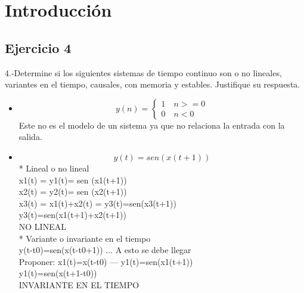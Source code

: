 \documentclass[10pt,a4paper]{report}
\begin{document}
\thispagestyle{fancy}
\tableofcontents
\newpage
\setcounter{chapter}{1}
\section[Introducción]{Introducción}

\subsection{Ejercicio 4}
4.-Determine si los siguientes sistemas de tiempo continuo son o no lineales, variantes en el tiempo, causales, con memoria y estables. Justifique su respuesta.
\begin{itemize}
\item \begin{equation}
 y(n)=
 \left\{
  \begin{aligned}
   1\quad n>=0\\
   0\quad n<0\
  \end{aligned}
 \right.
\label{escunit}
\end{equation}
Este no es el modelo de un sistema ya que no relaciona la entrada con la salida.
\item  \begin{equation*}
y(t)=sen(x(t+1))
\end{equation*} 
* Lineal o no lineal\\
   
   x1(t) = y1(t)= sen (x1(t+1))\\
   x2(t) = y2(t)= sen (x2(t+1))\\
   x3(t) = x1(t)+x2(t) = y3(t)=sen(x3(t+1))\\
                         y3(t)=sen(x1(t+1)+x2(t+1))\\
   
 NO LINEAL\\
   
* Variante o invariante en el tiempo\\
	
	y(t-t0)=sen(x(t-t0+1)) ... A esto se debe llegar\\
	Proponer: x1(t)=x(t-t0) --- y1(t)=sen(x1(t+1))\\
	y1(t)=sen(x(t+1-t0))\\
	
	INVARIANTE EN EL TIEMPO\\
	

\end{itemize}
\end{document}
